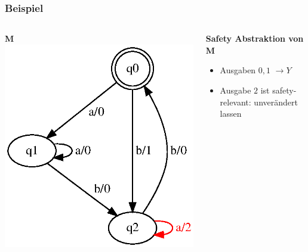 \documentclass[10pt]{beamer}
\begin{document}
\begin{frame}
\frametitle{Beispiel}
\begin{columns}[T] %

\begin{column}{.50\textwidth}
\textbf{M}
\includegraphics[width=\textwidth]{images/fsm-example01}
\end{column}%

\begin{column}{.50\textwidth}
\textbf{Safety Abstraktion von M}\\
\begin{itemize}
\item Ausgaben $0,1$  $\rightarrow Y$
\item Ausgabe $2$ ist safety-relevant: unverändert lassen
\end{itemize}
\end{column}%
\end{columns}
\end{frame}
\end{document}
